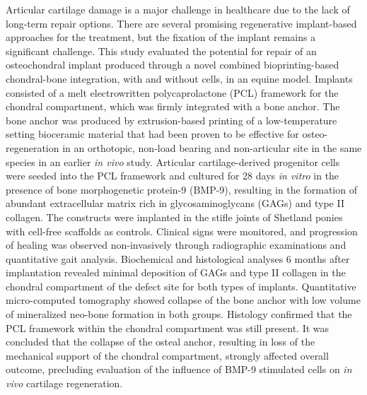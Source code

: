 \documentclass[twocolumn, reflection, authordate, serif, seplic]{jote-article}
\begin{document}
        Articular cartilage damage is a major challenge in healthcare due to the lack of long-term repair options. There are several promising regenerative implant-based approaches for the treatment, but the fixation of the implant remains a significant challenge. This study evaluated the potential for repair of an osteochondral implant produced through a novel combined bioprinting-based chondral-bone integration, with and without cells, in an equine model. Implants consisted of a melt electrowritten polycaprolactone (PCL) framework for the chondral compartment, which was firmly integrated with a bone anchor. The bone anchor was produced by extrusion-based printing of a low-temperature setting bioceramic material that had been proven to be effective for osteo-regeneration in an orthotopic, non-load bearing and non-articular site in the same species in an earlier \emph{in vivo} study. Articular cartilage-derived progenitor cells were seeded into the PCL framework and cultured for 28 days \emph{in vitro} in the presence of bone morphogenetic protein-9 (BMP-9), resulting in the formation of abundant extracellular matrix rich in glycosaminoglycans (GAGs) and type II collagen. The constructs were implanted in the stifle joints of Shetland ponies with cell-free scaffolds as controls. Clinical signs were monitored, and progression of healing was observed non-invasively through radiographic examinations and quantitative gait analysis. Biochemical and histological analyses 6 months after implantation revealed minimal deposition of GAGs and type II collagen in the chondral compartment of the defect site for both types of implants. Quantitative micro-computed tomography showed collapse of the bone anchor with low volume of mineralized neo-bone formation in both groups. Histology confirmed that the PCL framework within the chondral compartment was still present. It was concluded that the collapse of the osteal anchor, resulting in loss of the mechanical support of the chondral compartment, strongly affected overall outcome, precluding evaluation of the influence of BMP-9 stimulated cells on \emph{in vivo} cartilage regeneration.\newline
{}
    \newpage
\end{document}

